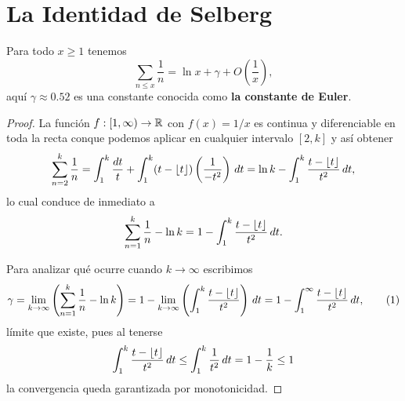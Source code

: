 \setlength{\headheight}{14.61858pt}
\pagestyle{fancy}

\chapter[La Identidad de Selberg]
{La Identidad de Selberg}
\label{ch:selberg}

\begin{lemma}
  \label{lem:harmonic}
  Para todo \(x \geq 1\) tenemos
  \[
    \sum_{n \leq x} \frac{1}{n} = \ln x + \gamma + O\left(\frac{1}{x}\right),
  \]
  aqu\'i \(\gamma \approx 0.52\) es una constante conocida como
  \textbf{la constante de Euler}.
\end{lemma}

\begin{proof}
  La funci\'on \(f : [1, \infty) \to \mathbb{R}\) con \(f(x)=1/x\) es continua y
  diferenciable en toda la recta conque podemos aplicar 
  en cualquier intervalo \([2, k]\)
  y as\'i obtener
  \[
    \sum_{n = 2}^k \frac{1}{n} =
    \int_1^k \frac{dt}{t} + \int_{1}^k (t - \left\lfloor t \right\rfloor)\left( \frac{1}{-t^2} \right) \, dt
    = \ln k - \int_1^k \frac{t - \left\lfloor t \right\rfloor}{t^2} \, dt,
  \]
  lo cual conduce de inmediato a 
  \[
    \sum_{n = 1}^k \frac{1}{n} - \ln k
    = 1 - \int_1^k \frac{t - \left\lfloor t \right\rfloor}{t^2} \, dt.
  \]
  
  Para analizar qu\'e ocurre cuando \(k \to \infty\) escribimos
  \[
    \gamma = \lim_{k \to \infty} \parentheses{\sum_{n = 1}^k \frac{1}{n} - \ln k}
    = 1 - \lim_{k \to \infty}  \parentheses{\int_1^k \frac{t - \floor{t}}{t^2}} \, dt
    = 1 - \int_1^\infty \frac{t - \floor{t}}{t^2} \, dt,
    \eqlabel{eq:floor-int}
  \]
  l\'imite que existe, pues al tenerse 
  \begin{align*}
    \int_1^k \frac{t - \left\lfloor t \right\rfloor}{t^2} \, dt
    \le \int_1^k \frac{1}{t^2} \, dt
    = 1 -\frac{1}{k}
    \le 1
  \end{align*}
  la convergencia queda garantizada por monotonicidad.
  

\end{proof}
